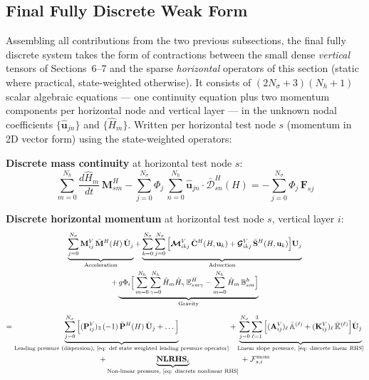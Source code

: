 \documentclass{article}
\newcommand{\Ns}{N_\sigma}
\newcommand{\uk}{\mathbf{u}_k}
\newcommand{\sumj}{\sum_{j=0}^{\Ns}}
\newcommand{\sumk}{\sum_{k=0}^{\Ns}}
\newcommand{\VMij}{\mathbf{M}_{ij}^V}
\newcommand{\VAij}{\mathbf{A}_{ij}^V}
\newcommand{\VKij}{\mathbf{K}_{ij}^V}
\newcommand{\VMikj}{\boldsymbol{\mathcal{M}}_{ikj}^V}
\newcommand{\VGikj}{\boldsymbol{\mathcal{G}}_{ikj}^V}
\newcommand{\VPij}{\mathbf{P}_{ij}^V}
\newcommand{\Nh}{N_h}
\newcommand{\sumNhn}{\sum_{n=0}^{\Nh}}
\newcommand{\sumNhm}{\sum_{m=0}^{\Nh}}
\newcommand{\sumNh}[1]{\sum_{#1=0}^{\Nh}}
\newcommand{\uhjn}{\hat{\mathbf{u}}_{jn}}
\newcommand{\Hm}{\hat{H}_m}
\newcommand{\HMsm}{\mathbf{M}_{sm}^H}
\newcommand{\HDdwsn}{\bar{\boldsymbol{\mathcal{D}}}_{sn}^H}
\begin{document}
\subsection{Final Fully Discrete Weak Form}

Assembling all contributions from the two previous subsections, the final fully discrete system takes the form of contractions between the small dense \emph{vertical} tensors of Sections~6--7 and the sparse \emph{horizontal} operators of this section (static where practical, state-weighted otherwise).
It consists of $(2\Ns+3)(\Nh+1)$ scalar algebraic equations — one continuity equation plus two momentum components per horizontal node and vertical layer — in the unknown nodal coefficients $\{\uhjn\}$ and $\{\Hm\}$. Written per horizontal test node $s$ (momentum in 2D vector form) using the state-weighted operators:

\begin{framed}
\noindent\textbf{Discrete mass continuity} at horizontal test node $s$:
\begin{equation}
    \sumNhm\frac{d\Hm}{dt}\,\HMsm
    - \sumj\Phi_j\,\sumNhn \uhjn\cdot\HDdwsn(H)
    = -\sumj\Phi_j\,\mathbf{F}_{sj}
    \label{eq: final discrete mass continuity}
\end{equation}

\bigskip
\noindent\textbf{Discrete horizontal momentum} at horizontal test node $s$, vertical layer $i$:
\begin{multline}
    \underbrace{\sumj\VMij\,\bar{\mathbf{M}}^H(H)\,\dot{\mathbf{U}}_j}_{\text{Acceleration}}
    +\underbrace{\sumk\sumj\Big[\VMikj\,\bar{\mathbf{C}}^H(H,\uk) + \VGikj\,\bar{\mathbf{S}}^H(H,\uk)\Big]\mathbf{U}_j}_{\text{Advection}}\\
    +\underbrace{g\Phi_i\Big[\sumNhm\sumNh{\gamma}\Hm\hat{H}_\gamma\,\mathbb{E}^H_{sm\gamma} - \sumNhm\Hm\,\mathbb{B}^h_{sm}\Big]}_{\text{Gravity}} \\[6pt]
    = \underbrace{\sumj \Big[ (\VPij)_3\,(-1)\,\bar{\mathbf{P}}^H(H)\,\dot{\mathbf{U}}_j + \dots\Big]}_{\text{Leading pressure (dispersion), \eqref{eq: def state weighted leading pressure operator}}}
    + \underbrace{\sumj\sum_{\ell=1}^{3}\Big[(\VAij)_\ell\,\bar{\mathbb{A}}^{(\ell)} + (\VKij)_\ell\,\bar{\mathbb{K}}^{(\ell)}\Big]\dot{\mathbf{U}}_j}_{\text{Linear slope pressure, \eqref{eq: discrete linear RHS}}}\\
    + \underbrace{\mathbf{NLRHS}_{i}}_{\text{Non-linear pressure, \eqref{eq: discrete nonlinear RHS}}}
    \;+\; \mathcal{F}_{s,i}^{\text{mom}}
    \label{eq: final discrete momentum}
\end{multline}
\end{framed}
\end{document}
